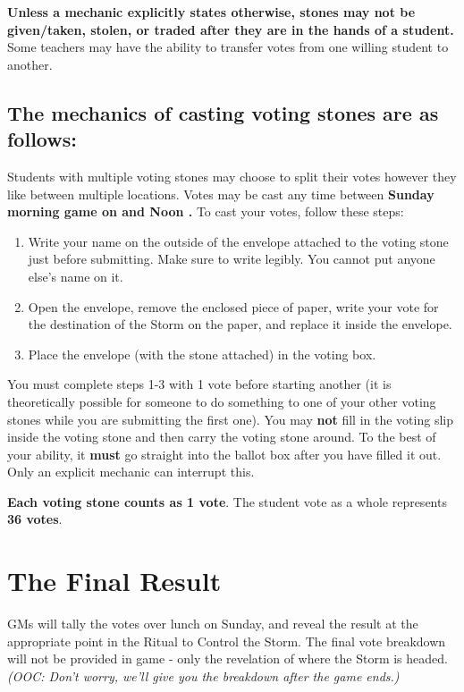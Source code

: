 \documentclass[green]{GL2020}
\begin{document}
\textbf{Unless a mechanic explicitly states otherwise, stones may not be given/taken, stolen, or traded after they are in the hands of a student.} Some teachers may have the ability to transfer votes from one willing student to another. 

\subsection*{The mechanics of casting voting stones are as follows:}

Students with multiple voting stones may choose to split their votes however they like between multiple locations. Votes may be cast any time between \textbf{Sunday morning game on and Noon .} To cast your votes, follow these steps:

\begin{enumerate}
  \item Write your name on the outside of the envelope attached to the voting stone just before submitting. Make sure to write legibly. You cannot put anyone else's name on it.
  \item Open the envelope, remove the enclosed piece of paper, write your vote for the destination of the Storm on the paper, and replace it inside the envelope.
  \item Place the envelope (with the stone attached) in the voting box.
\end{enumerate}

You must complete steps 1-3 with 1 vote before starting another (it is theoretically possible for someone to do something to one of your other voting stones while you are submitting the first one). You may \textbf{not} fill in the voting slip inside the voting stone and then carry the voting stone around. To the best of your ability, it \textbf{must} go straight into the ballot box after you have filled it out. Only an explicit mechanic can interrupt this.

\textbf{Each voting stone counts as 1 vote}. The student vote as a whole represents \textbf{36 votes}.

\section*{The Final Result}
GMs will tally the votes over lunch on Sunday, and reveal the result at the appropriate point in the Ritual to Control the Storm. The final vote breakdown will not be provided in game - only the revelation of where the Storm is headed. \emph{(OOC: Don't worry, we'll give you the breakdown after the game ends.)}
\end{document}

